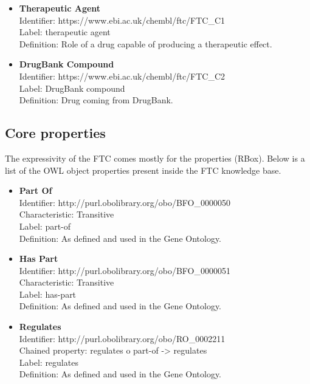 \documentclass{bioinfo}
\begin{document}
\begin{itemize}
\item \textbf{Therapeutic Agent} \\
Identifier: https://www.ebi.ac.uk/chembl/ftc/FTC\_C1 \\
Label: therapeutic agent \\
Definition: Role of a drug capable of producing a therapeutic effect.
\end{itemize}

\begin{itemize}
\item \textbf{DrugBank Compound} \\
Identifier: https://www.ebi.ac.uk/chembl/ftc/FTC\_C2 \\
Label: DrugBank compound \\
Definition: Drug coming from DrugBank.
\end{itemize}

\subsection{Core properties}
The expressivity of the FTC comes mostly for the properties (RBox). Below is a list of the 
OWL object properties present inside the FTC knowledge base.

\begin{itemize}
\item \textbf{Part Of} \\
Identifier: http://purl.obolibrary.org/obo/BFO\_0000050 \\
Characteristic: Transitive \\
Label: part-of \\
Definition: As defined and used in the Gene Ontology.
\end{itemize}

\begin{itemize}
\item \textbf{Has Part} \\
Identifier: http://purl.obolibrary.org/obo/BFO\_0000051 \\
Characteristic: Transitive \\
Label: has-part \\
Definition: As defined and used in the Gene Ontology.
\end{itemize}

\begin{itemize}
\item \textbf{Regulates} \\
Identifier: http://purl.obolibrary.org/obo/RO\_0002211 \\
Chained property: regulates o part-of -> regulates \\
Label: regulates \\
Definition: As defined and used in the Gene Ontology.
\end{itemize}
\end{document}
